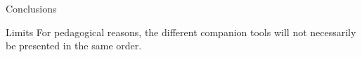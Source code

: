 \begin{frame}{}
\huge{Conclusions}
\end{frame}
\begin{frame}{Limits}
    For pedagogical reasons, the different companion tools will not necessarily be presented in the same order. 
\end{frame}